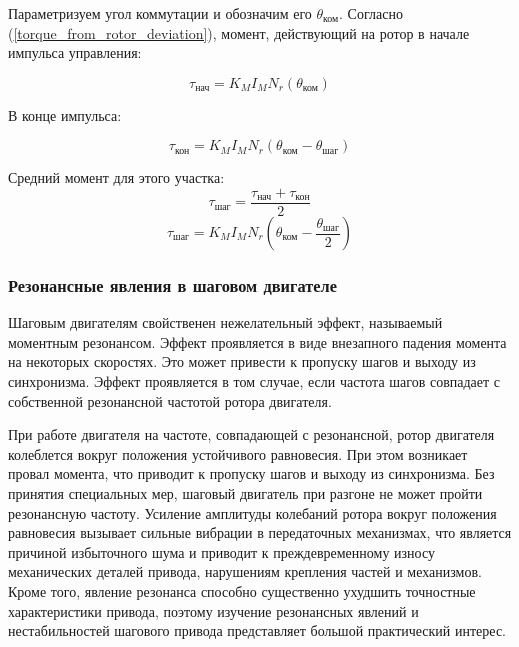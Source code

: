 Параметризуем угол коммутации и обозначим его $\theta_{\text{ком}}$.
Согласно (\ref{torque_from_rotor_deviation}), момент, действующий на ротор
в начале импульса управления:

\begin{equation}
    \label{moment_to_rotor_at_the_begin_of_control_pulse}
    \tau_{\text{нач}} = K_{M} I_{M} N_{r} ( \theta_{\text{ком}} )
\end{equation}

В конце импульса:

\begin{equation}
    \label{moment_to_rotor_at_the_end_of_control_pulse}
    \tau_{\text{кон}} = K_{M} I_{M} N_{r} ( \theta_{\text{ком}} - \theta_{\text{шаг}} )
\end{equation}

Средний момент для этого участка:
$$
    \tau_{\text{шаг}} = \frac{ \tau_{\text{нач}} + \tau_{\text{кон}} }{ 2 }
$$
$$
    \tau_{\text{шаг}} = K_{M} I_{M} N_{r} ( \theta_{\text{ком}} - \frac{ \theta_{\text{шаг}} }{ 2 } )
$$

\subsubsection{Резонансные явления в шаговом двигателе}
Шаговым двигателям свойственен нежелательный эффект, называемый моментным резонансом. Эффект
проявляется в виде внезапного падения момента на некоторых скоростях. Это может привести к пропуску
шагов и выходу из синхронизма. Эффект проявляется в том случае, если частота шагов совпадает с
собственной резонансной частотой ротора двигателя.

При работе двигателя на частоте, совпадающей с резонансной, ротор двигателя колеблется вокруг
положения устойчивого равновесия. При этом возникает провал момента, что приводит к пропуску шагов и
выходу из синхронизма. Без принятия специальных мер, шаговый двигатель при разгоне не может пройти резонансную
частоту. Усиление амплитуды колебаний ротора вокруг положения равновесия вызывает сильные вибрации в
передаточных механизмах, что является причиной избыточного шума и приводит к преждевременному износу
механических деталей привода, нарушениям крепления частей и механизмов. Кроме того,
явление резонанса способно существенно ухудшить точностные характеристики привода, поэтому изучение
резонансных явлений и нестабильностей шагового привода представляет большой практический интерес.
\newline

